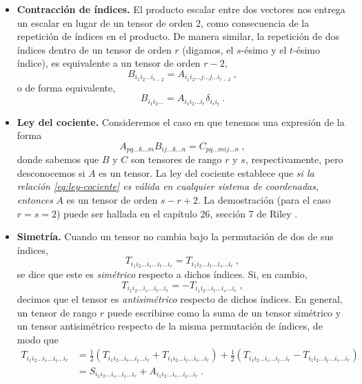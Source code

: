 \begin{itemize}
    \item \textbf{Contracción de índices.} El producto escalar entre dos vectores nos entrega un escalar en lugar de un tensor de orden 2, como consecuencia de la repetición de índices en el producto. De manera similar, la repetición de dos índices dentro de un tensor de orden $r$ (digamos, el $s$-ésimo y el $t$-ésimo índice), es equivalente a un tensor de orden $r-2$,
    \begin{equation}
        B_{i_1 i_2 \dots i_{r-2}} = A_{i_1 i_2 \dots j \dots j \dots i_{r-2}} \ ,
    \end{equation}
    o de forma equivalente,
    \begin{equation}
        B_{i_1 i_2 \dots} = A_{i_1 i_2 \dots i_r} \delta_{i_s i_t} \ .
    \end{equation}

    \item \textbf{Ley del cociente.} Consideremos el caso en que tenemos una expresión de la forma
    \begin{equation}\label{eq:ley-cociente}
        A_{pq \dots k \dots m} B_{ij \dots k \dots n} = C_{pq \dots m ij \dots n} \ ,
    \end{equation}
    donde sabemos que $B$ y $C$ son tensores de rango $r$ y $s$, respectivamente, pero desconocemos si $A$ es un tensor. La ley del cociente establece que \emph{si la relación \eqref{eq:ley-cociente} es válida en cualquier sistema de coordenadas, entonces} $A$ es un tensor de orden $s-r+2$. La demostración (para el caso $r=s=2$) puede ser hallada en el capítulo 26, sección 7 de Riley \cite{Riley}.
    
    \item \textbf{Simetría.} Cuando un tensor no cambia bajo la permutación de dos de sus índices, 
    \begin{equation}
        T_{i_1 i_2 \dots i_s \dots i_t \dots i_r} = T_{i_1 i_2 \dots i_t \dots i_s \dots i_r} \ , 
    \end{equation}
    se dice que este es \emph{simétrico} respecto a dichos índices. Si, en cambio,
    \begin{equation}
        T_{i_1 i_2 \dots i_s \dots i_t \dots i_r} = - T_{i_1 i_2 \dots i_t \dots i_s \dots i_r} \ ,
    \end{equation}
    decimos que el tensor es \emph{antisimétrico} respecto de dichos índices. En general, un tensor de rango $r$ puede escribirse como la suma de un tensor simétrico y un tensor antisimétrico respecto de la misma permutación de índices, de modo que
    \begin{align}
        T_{i_1 i_2 \dots i_s \dots i_t \dots i_r} & = \frac{1}{2} (T_{i_1 i_2 \dots i_s \dots i_t \dots i_r} + T_{i_1 i_2 \dots i_t \dots i_s \dots i_r}) + \frac{1}{2}(T_{i_1 i_2 \dots i_s \dots i_t \dots i_r} - T_{i_1 i_2 \dots i_t \dots i_s \dots i_r}) \\
        & = S_{i_1 i_2 \dots i_s \dots i_t \dots i_r} + A_{i_1 i_2 \dots i_s \dots i_t \dots i_r} \ .
    \end{align}


\end{itemize}

